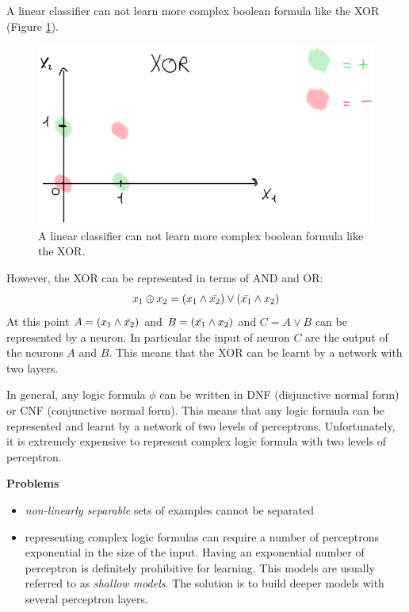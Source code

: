 A linear classifier can not learn more complex boolean formula like the XOR (Figure \ref{fig:xorPerceptron}). \newline

\begin{figure}
    \centering
    \includegraphics[scale=0.5]{images/xorPerceptron.png}
    \caption{A linear classifier can not learn more complex boolean formula like the XOR.}
    \label{fig:xorPerceptron}
\end{figure}

However, the XOR can be represented in terms of AND and OR:
$$x_1 \oplus x_2 = (x_1 \wedge \Bar{x_2}) \vee (\Bar{x_1} \wedge x_2)$$
At this point $A=(x_1 \wedge \Bar{x_2})$ and $B=(\Bar{x_1} \wedge x_2)$ and $C = A \vee B$ can be represented by a neuron. In particular the input of neuron $C$ are the output of the neurons $A$ and $B$. This means that the XOR can be learnt by a network with two layers. \newline

In general, any logic formula $\phi$ can be written in DNF (disjunctive normal form) or CNF (conjunctive normal form). This means that any logic formula can be represented and learnt by a network of two levels of perceptrons. Unfortunately, it is extremely expensive to represent complex logic formula with two levels of perceptron. \newline

\textbf{Problems}
\begin{itemize}
    \item \textit{non-linearly separable} sets of examples cannot be separated
    \item representing complex logic formulas can require a number of perceptrons exponential in the size of the input. Having an exponential number of perceptron is definitely prohibitive for learning. This models are usually referred to as \textit{shallow models}. The solution is to build deeper models with several perceptron layers. 
\end{itemize}

